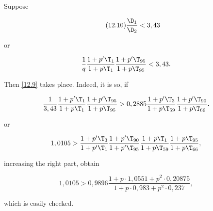 Suppose

\begin{equation}\tag{12.10}\label{goodness_condition_3,43}
	\dfrac{\D_1}{\D_2} < 3,43
\end{equation}

or

\begin{equation*}
	\dfrac{1}{q}
	\dfrac{1 + p' \T_{1}}{1 + p \T_{1}}
	\dfrac{1 + p' \T_{95}}{1 + p \T_{95}}
	<
	3,43.
\end{equation*}

Then \ref{12.9} takes place. Indeed, it is so, if

\begin{equation*}
	\dfrac{1}{3,43}
	\dfrac{1 + p' \T_{1}}{1 + p \T_{1}}
	\dfrac{1 + p' \T_{95}}{1 + p \T_{95}}
	>
	0,2885
	\dfrac{1 + p' \T_{3}}{1 + p \T_{59}}
	\dfrac{1 + p' \T_{90}}{1 + p \T_{66}}.
\end{equation*}

or

\begin{equation*}
	1,0105
	>
	\dfrac{1 + p' \T_{3}}{1 + p' \T_{1}}
	\dfrac{1 + p' \T_{90}}{1 + p' \T_{95}}
	\dfrac{1 + p \T_{1}}{1 + p \T_{59}}
	\dfrac{1 + p \T_{95}}{1 + p \T_{66}},
\end{equation*}

increasing the right part, obtain

\begin{equation*}
	1,0105
	>
	0,9896
	\dfrac
	{1 + p \cdot 1,0551 + p^2 \cdot 0,20875}
	{1 + p \cdot 0,983 + p^2 \cdot 0,237},
\end{equation*}

which is easily checked.
